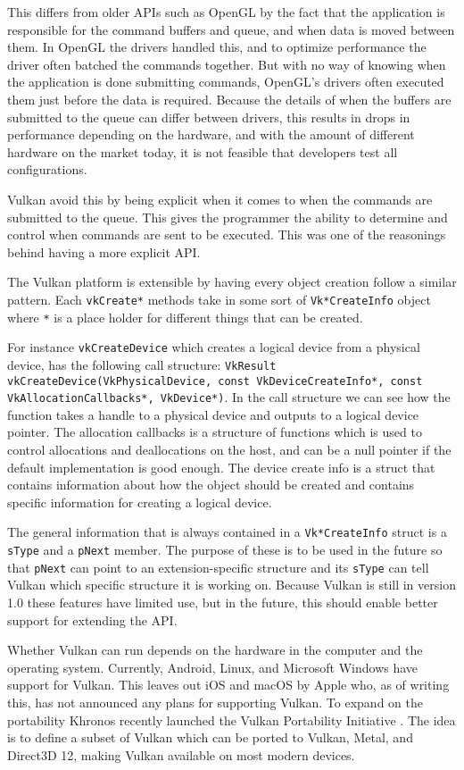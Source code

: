 This differs from older \glspl{API} such as OpenGL by the fact that the application is responsible for the command buffers and queue, and when data is moved between them.
In OpenGL the drivers handled this, and to optimize performance the driver often batched the commands together.
But with no way of knowing when the application is done submitting commands, OpenGL's drivers often executed them just before the data is required.
Because the details of when the buffers are submitted to the queue can differ between drivers, this results in drops in performance depending on the hardware, and with the amount of different hardware on the market today, it is not feasible that developers test all configurations.

Vulkan avoid this by being explicit when it comes to when the commands are submitted to the queue.
This gives the programmer the ability to determine and control when commands are sent to be executed.
This was one of the reasonings behind having a more explicit \gls{API}.

The Vulkan platform is extensible by having every object creation follow a similar pattern.
Each \texttt{vkCreate*} methods take in some sort of \texttt{Vk*Create\-Info} object where \texttt{*} is a place holder for different things that can be created.

For instance \texttt{vkCreateDevice} which creates a logical device from a physical device, has the following call structure: \texttt{VkResult vkCreateDevice(VkPhysicalDevice, const VkDeviceCreateInfo*, const VkAllocationCallbacks*, VkDevice*)}.
In the call structure we can see how the function takes a handle to a physical device and outputs to a logical device pointer.
The allocation callbacks is a structure of functions which is used to control allocations and deallocations on the host, and can be a null pointer if the default implementation is good enough.
The device create info is a struct that contains information about how the object should be created and contains specific information for creating a logical device.

The general information that is always contained in a \texttt{Vk*CreateInfo} struct is a \texttt{sType} and a \texttt{pNext} member.
The purpose of these is to be used in the future so that \texttt{pNext} can point to an extension-specific structure and its \texttt{sType} can tell Vulkan which specific structure it is working on.
Because Vulkan is still in version 1.0 these features have limited use, but in the future, this should enable better support for extending the \gls{API}.

Whether Vulkan can run depends on the hardware in the computer and the operating system.
Currently, Android, Linux, and Microsoft Windows have support for Vulkan.
This leaves out iOS and macOS by Apple who, as of writing this, has not announced any plans for supporting Vulkan.
To expand on the portability Khronos recently launched the Vulkan Portability Initiative \cite{kilde}.
The idea is to define a subset of Vulkan which can be ported to Vulkan, Metal, and Direct3D 12, making Vulkan available on most modern devices.